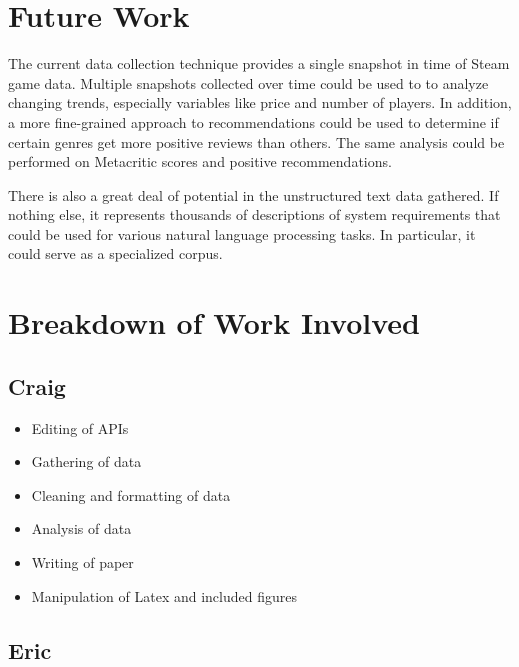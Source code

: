\documentclass[10pt,journal,compsoc]{IEEEtran}
\begin{document}

\section{Future Work}

The current data collection technique provides a single snapshot in time of
Steam game data. Multiple snapshots collected over time could be used to to
analyze changing trends, especially variables like price and number of
players. In addition, a more fine-grained approach to recommendations could be
used to determine if certain genres get more positive reviews than others. The
same analysis could be performed on Metacritic scores and positive
recommendations.

There is also a great deal of potential in the unstructured text data gathered.
If nothing else, it represents thousands of descriptions of system requirements
that could be used for various natural language processing tasks. In particular, it
could serve as a specialized corpus.


\section{Breakdown of Work Involved}

\subsection{Craig}

\begin{itemize}
    \item Editing of APIs
    \item Gathering of data
    \item Cleaning and formatting of data
    \item Analysis of data
    \item Writing of paper
    \item Manipulation of Latex and included figures
\end{itemize}

\subsection{Eric}
\end{document}
